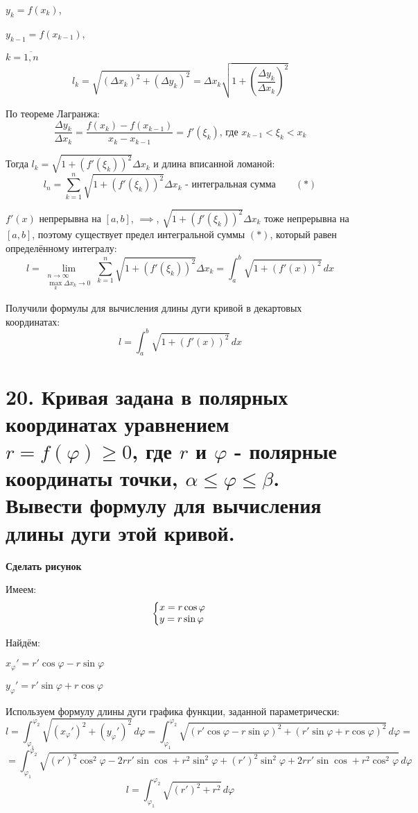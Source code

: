 \documentclass[11pt]{article}
\begin{document}
\par $y_{k} = f(x_{k})$,
\par $y_{k-1} = f(x_{k-1})$,
\par $k = \overline{1, n}$
$$l_{k} = \sqrt{ (\Delta x_{k})^2 + (\Delta y_{k})^2} = \Delta x_{k} \sqrt{ 1 + \left(\frac{\Delta y_{k}}{\Delta x_{k}}\right)^2 }$$
\par По теореме Лагранжа:$$\frac{\Delta y_{k}}{\Delta x_{k}} = \frac{f(x_{k}) - f(x_{k-1})}{x_{k} - x_{k-1}} = f'(\xi_{k}) \text{, где } x_{k-1} < \xi_{k} < x_{k}$$
\par Тогда $l_{k} = \sqrt{ 1 + (f'(\xi_{k}))^2 } \Delta x_{k}$ и длина вписанной ломаной: $$l_{n} = \sum_{k=1}^n \sqrt{ 1 + (f'(\xi_{k}))^2 } \Delta x_{k} \text{ - интегральная сумма}\qquad (*)$$
\par $f'(x)$ непрерывна на $[a, b]$, $\implies$, $\sqrt{ 1 + (f'(\xi_{k}))^2 } \Delta x_{k}$ тоже непрерывна на $[a, b]$, поэтому существует предел интегральной суммы $(*)$, который равен определённому интегралу:$$l = \lim_{\substack{n \to \infty \\ \max_{k} \Delta x_{k} \to 0}} \sum_{k=1}^n \sqrt{ 1 + (f'(\xi_{k}))^2 } \Delta x_{k} = \int_{a}^b \sqrt{ 1 + (f'(x))^2 } \, dx$$
\par Получили формулы для вычисления длины дуги кривой в декартовых координатах:$$l = \int_{a}^b \sqrt{ 1 + (f'(x))^2 } \, dx$$

\section*{20. Кривая задана в полярных координатах уравнением $r = f(\varphi) \geq 0$, где $r$ и $\varphi$ - полярные координаты точки, $\alpha \leq \varphi \leq \beta$. Вывести формулу для вычисления длины дуги этой кривой.}
\par\textbf{Сделать рисунок}
\par Имеем: $$\left\{\begin{array}{@{}l@{}} x = r \cos \varphi \\ y = r \sin \varphi \end{array}\right.\,$$
\par Найдём:
\par $x_{\varphi}' = r' \cos \varphi - r \sin \varphi$
\par $y_{\varphi}' = r' \sin \varphi + r \cos \varphi$
\par Используем формулу длины дуги графика функции, заданной параметрически:$$l = \int_{\varphi_{1}}^{\varphi_{2}} \sqrt{ (x_{\varphi}')^2 + (y_{\varphi}')^2 } \, d\varphi = \int_{\varphi_{1}}^{\varphi_{2}} \sqrt{ (r' \cos \varphi - r \sin \varphi)^2 + (r' \sin \varphi + r \cos \varphi)^2 }\, d\varphi =$$
$$= \int_{\varphi_{1}}^{\varphi_{2}} \sqrt{ (r')^2 \cos^2 \varphi - 2 r r' \sin \cos + r^2\sin^2 \varphi + (r')^2 \sin^2 \varphi + 2 r r' \sin \cos + r^2 \cos^2 \varphi } \, d\varphi$$
$$l = \int_{\varphi_{1}}^{\varphi_{2}} \sqrt{ (r')^2 + r^2 }\, d\varphi$$
\end{document}

